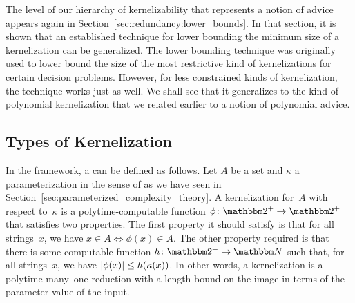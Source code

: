 The level of our hierarchy of kernelizability that represents a notion of advice appears again in Section~\ref{sec:redundancy:lower_bounds}.
In that section, it is shown that an established technique for lower bounding the minimum size of a kernelization can be generalized.
The lower bounding technique was originally used to lower bound the size of the most restrictive kind of kernelizations for certain decision problems.
However, for less constrained kinds of kernelization, the technique works just as well.
We shall see that it generalizes to the kind of polynomial kernelization that we related earlier to a notion of polynomial advice.

\subsection{Types of Kernelization}
\label{sec:redundancy:types}%
In the \citeauthor{flum2006parameterized} framework, a  can be defined as follows.
Let $A$ be a set and $\kappa$ a parameterization in the sense of \citeauthor{flum2006parameterized} as we have seen in Section~\ref{sec:parameterized_complexity_theory}.
A kernelization for~$A$ with respect to~$\kappa$ is a polytime-computable function $\phi\colon \binary^+ \to \binary^+$ that satisfies two properties.
The first property it should satisfy is that for all strings~$x$, we have $x \in A \iff \phi(x) \in A$.
The other property required is that there is some computable function $h\colon \binary^+ \to \bbN$ such that, for all strings~$x$, we have ${\lvert\phi(x)\rvert} \le h(\kappa(x))$.
In other words, a kernelization is a polytime many--one reduction with a length bound on the image in terms of the parameter value of the input.

